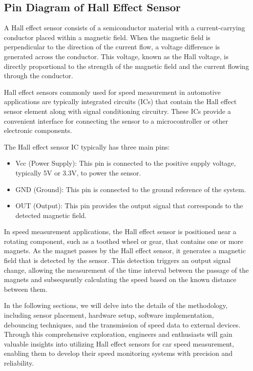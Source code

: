 \documentclass[
12pt,
oneside, 
onehalfspacing, 
nolistspacing, 
parskip, 
chapterinoneline, 
]{AASTCOMPUTER}
\begin{document}
\subsection{Pin Diagram of Hall Effect Sensor}
A Hall effect sensor consists of a semiconductor material with a current-carrying conductor placed within a magnetic field. When the magnetic field is perpendicular to the direction of the current flow, a voltage difference is generated across the conductor. This voltage, known as the Hall voltage, is directly proportional to the strength of the magnetic field and the current flowing through the conductor.

Hall effect sensors commonly used for speed measurement in automotive applications are typically integrated circuits (ICs) that contain the Hall effect sensor element along with signal conditioning circuitry. These ICs provide a convenient interface for connecting the sensor to a microcontroller or other electronic components.

The Hall effect sensor IC typically has three main pins:
\begin{itemize}
    \item Vcc (Power Supply): This pin is connected to the positive supply voltage, typically 5V or 3.3V, to power the sensor.
    \item GND (Ground): This pin is connected to the ground reference of the system.
    \item OUT (Output): This pin provides the output signal that corresponds to the detected magnetic field.
\end{itemize}

In speed measurement applications, the Hall effect sensor is positioned near a rotating component, such as a toothed wheel or gear, that contains one or more magnets. As the magnet passes by the Hall effect sensor, it generates a magnetic field that is detected by the sensor. This detection triggers an output signal change, allowing the measurement of the time interval between the passage of the magnets and subsequently calculating the speed based on the known distance between them.

In the following sections, we will delve into the details of the methodology, including sensor placement, hardware setup, software implementation, debouncing techniques, and the transmission of speed data to external devices. Through this comprehensive exploration, engineers and enthusiasts will gain valuable insights into utilizing Hall effect sensors for car speed measurement, enabling them to develop their speed monitoring systems with precision and reliability.
\end{document}
